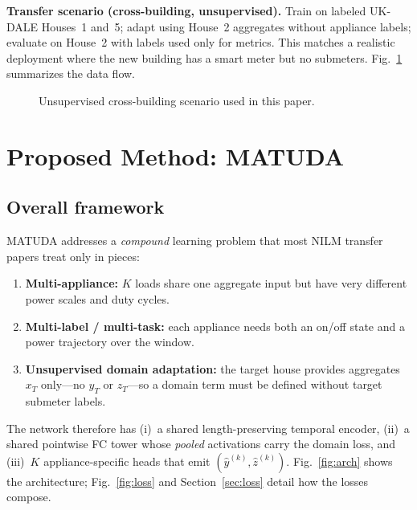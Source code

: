 \documentclass[journal]{IEEEtran}
\begin{document}
\textbf{Transfer scenario (cross-building, unsupervised).}
Train on labeled UK-DALE Houses~1 and~5; adapt using House~2 aggregates without appliance labels; evaluate on House~2 with labels used only for metrics.
This matches a realistic deployment where the new building has a smart meter but no submeters.
Fig.~\ref{fig:scenario} summarizes the data flow.

\begin{figure}[!t]
\centering
{}
\caption{Unsupervised cross-building scenario used in this paper.}
\label{fig:scenario}
\end{figure}

\section{Proposed Method: MATUDA}
\subsection{Overall framework}
MATUDA addresses a \emph{compound} learning problem that most NILM transfer papers treat only in pieces:
\begin{enumerate}
\item \textbf{Multi-appliance:} $K$ loads share one aggregate input but have very different power scales and duty cycles.
\item \textbf{Multi-label / multi-task:} each appliance needs both an on/off state and a power trajectory over the window.
\item \textbf{Unsupervised domain adaptation:} the target house provides aggregates $x_T$ only---no $y_T$ or $z_T$---so a domain term must be defined without target submeter labels.
\end{enumerate}
The network therefore has (i)~a shared length-preserving temporal encoder, (ii)~a shared pointwise FC tower whose \emph{pooled} activations carry the domain loss, and (iii)~$K$ appliance-specific heads that emit $(\hat{y}^{(k)},\hat{z}^{(k)})$.
Fig.~\ref{fig:arch} shows the architecture; Fig.~\ref{fig:loss} and Section~\ref{sec:loss} detail how the losses compose.
\end{document}
